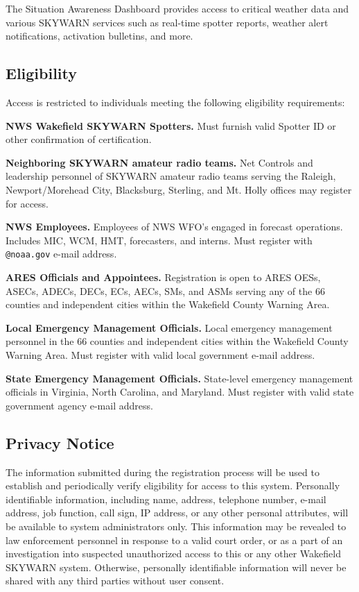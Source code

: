 \documentclass[pdflatex,letterpaper,twoside,12pt]{book}
\begin{document}
The Situation Awareness Dashboard provides access to critical weather data and various SKYWARN services such as real-time spotter reports, weather alert notifications, activation bulletins, and more.

\subsection{Eligibility}

Access is restricted to individuals meeting the following eligibility requirements:

\textbf{NWS Wakefield SKYWARN Spotters.} Must furnish valid Spotter ID or other confirmation of certification.

\textbf{Neighboring SKYWARN amateur radio teams.} Net Controls and leadership personnel of SKYWARN amateur radio teams serving the Raleigh, Newport/Morehead City, Blacksburg, Sterling, and Mt. Holly offices may register for access.

\textbf{NWS Employees.} Employees of NWS WFO's engaged in forecast operations. Includes MIC, WCM, HMT, forecasters, and interns. Must register with \verb|@noaa.gov| e-mail address.

\textbf{ARES Officials and Appointees.} Registration is open to ARES OESs, ASECs, ADECs, DECs, ECs, AECs, SMs, and ASMs serving any of the 66 counties and independent cities within the Wakefield County Warning Area.

\textbf{Local Emergency Management Officials.} Local emergency management personnel in the 66 counties and independent cities within the Wakefield County Warning Area. Must register with valid local government e-mail address.

\textbf{State Emergency Management Officials.} State-level emergency management officials in Virginia, North Carolina, and Maryland. Must register with valid state government agency e-mail address.

\subsection{Privacy Notice}

The information submitted during the registration process will be used to establish and periodically verify eligibility for access to this system.  Personally identifiable information, including name, address, telephone number, e-mail address, job function, call sign, IP address, or any other personal attributes, will be available to system administrators only.  This information may be revealed to law enforcement personnel in response to a valid court order, or as a part of an investigation into suspected unauthorized access to this or any other Wakefield SKYWARN system.  Otherwise, personally identifiable information will never be shared with any third parties without user consent.
\end{document}

